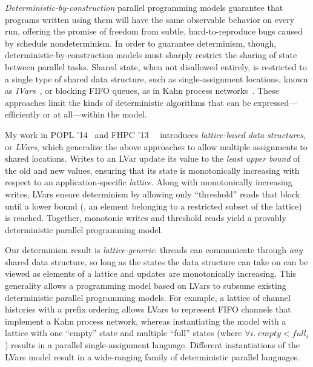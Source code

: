 \documentclass{article}
\begin{document}
\emph{Deterministic-by-construction} parallel programming models
guarantee that programs written using them will have the same
observable behavior on every run, offering the promise of freedom from
subtle, hard-to-reproduce bugs caused by schedule nondeterminism.  In
order to guarantee determinism, though, deterministic-by-construction
models must sharply restrict the sharing of state between parallel
tasks.  Shared state, when not disallowed entirely, is restricted to a
single type of shared data structure, such as single-assignment
locations, known as \emph{IVars}~\cite{IStructures, CnC}, or blocking
FIFO queues, as in Kahn process networks~\cite{Kahn-1974}.  These
approaches limit the kinds of deterministic algorithms that can be
expressed---efficiently or at all---within the model.

My work in POPL '14~\cite{Freeze-paper, Freeze-TR} and FHPC
'13~~\cite{LVars-paper, LVars-TR} introduces \emph{lattice-based data
  structures}, or \emph{LVars}, which generalize the above approaches
to allow multiple assignments to shared locations.  Writes to an LVar
update its value to the \emph{least upper bound} of the old and new
values, ensuring that its state is monotonically increasing with
respect to an application-specific \emph{lattice}.  Along with
monotonically increasing writes, LVars ensure determinism by allowing
only ``threshold'' reads that block until a lower bound (\ie, an
element belonging to a restricted subset of the lattice) is reached.
Together, monotonic writes and threshold reads yield a provably
deterministic parallel programming model.

Our determinism result is \emph{lattice-generic}: threads can
communicate through \emph{any} shared data structure, so long as the
states the data structure can take on can be viewed as elements of a
lattice and updates are monotonically increasing.  This generality
allows a programming model based on LVars to subsume existing
deterministic parallel programming models.  For example, a lattice of
channel histories with a prefix ordering allows LVars to represent
FIFO channels that implement a Kahn process network, whereas
instantiating the model with a lattice with one ``empty'' state and
multiple ``full'' states (where $\forall{i}.\; \mathit{empty} <
\mathit{full_i}$) results in a parallel single-assignment language.
Different instantiations of the LVars model result in a wide-ranging
family of deterministic parallel languages.
\end{document}
